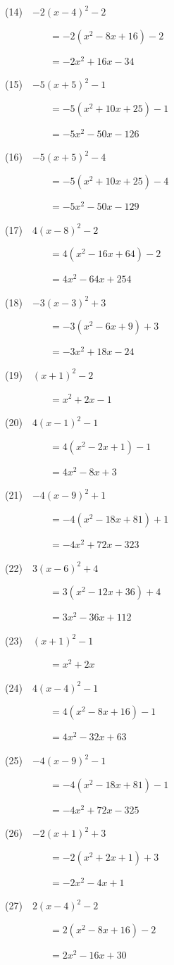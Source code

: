 \documentclass[a4j,twocolumn,10pt,fleqn]{jarticle}
\begin{document}
(14)~~$-2(x-4)^2-2$

~~~~~~~~~$=-2(x^2-8x +16)-2$

~~~~~~~~~$=-2x^2 +16x-34$

(15)~~$-5(x +5)^2-1$

~~~~~~~~~$=-5(x^2 +10x +25)-1$

~~~~~~~~~$=-5x^2-50x-126$

(16)~~$-5(x +5)^2-4$

~~~~~~~~~$=-5(x^2 +10x +25)-4$

~~~~~~~~~$=-5x^2-50x-129$

(17)~~$4(x-8)^2-2$

~~~~~~~~~$=4(x^2-16x +64)-2$

~~~~~~~~~$=4x^2-64x +254$

(18)~~$-3(x-3)^2 +3$

~~~~~~~~~$=-3(x^2-6x +9) +3$

~~~~~~~~~$=-3x^2 +18x-24$

(19)~~$(x +1)^2-2$

~~~~~~~~~$=x^2 +2x-1$

(20)~~$4(x-1)^2-1$

~~~~~~~~~$=4(x^2-2x +1)-1$

~~~~~~~~~$=4x^2-8x +3$

(21)~~$-4(x-9)^2 +1$

~~~~~~~~~$=-4(x^2-18x +81) +1$

~~~~~~~~~$=-4x^2 +72x-323$

(22)~~$3(x-6)^2 +4$

~~~~~~~~~$=3(x^2-12x +36) +4$

~~~~~~~~~$=3x^2-36x +112$

(23)~~$(x +1)^2-1$

~~~~~~~~~$=x^2 +2x$

(24)~~$4(x-4)^2-1$

~~~~~~~~~$=4(x^2-8x +16)-1$

~~~~~~~~~$=4x^2-32x +63$

(25)~~$-4(x-9)^2-1$

~~~~~~~~~$=-4(x^2-18x +81)-1$

~~~~~~~~~$=-4x^2 +72x-325$

(26)~~$-2(x +1)^2 +3$

~~~~~~~~~$=-2(x^2 +2x +1) +3$

~~~~~~~~~$=-2x^2-4x +1$

(27)~~$2(x-4)^2-2$

~~~~~~~~~$=2(x^2-8x +16)-2$

~~~~~~~~~$=2x^2-16x +30$
\end{document}
